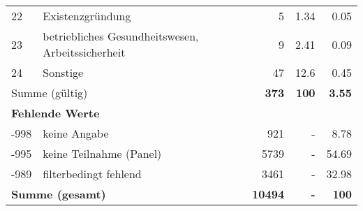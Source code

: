 \begin{longtable}{lXrrr}
        22 & \multicolumn{1}{X}{Existenzgründung} & %
          \num{5} &
          \num[round-mode=places,round-precision=2]{1,34} &
          \num[round-mode=places,round-precision=2]{0,05} \\

        23 & \multicolumn{1}{X}{betriebliches Gesundheitswesen, Arbeitssicherheit} & %
          \num{9} &
          \num[round-mode=places,round-precision=2]{2,41} &
          \num[round-mode=places,round-precision=2]{0,09} \\

        24 & \multicolumn{1}{X}{Sonstige} & %
          \num{47} &
          \num[round-mode=places,round-precision=2]{12,6} &
          \num[round-mode=places,round-precision=2]{0,45} \\

     \midrule
     \multicolumn{2}{l}{Summe (gültig)} &
       \textbf{\num{373}} &
     \textbf{100} &
       \textbf{\num[round-mode=places,round-precision=2]{3,55}} \\
     \multicolumn{5}{l}{\textbf{Fehlende Werte}}\\
       -998 &
       keine Angabe &
         \num{921} &
        - &
         \num[round-mode=places,round-precision=2]{8,78} \\
       -995 &
       keine Teilnahme (Panel) &
         \num{5739} &
        - &
         \num[round-mode=places,round-precision=2]{54,69} \\
       -989 &
       filterbedingt fehlend &
         \num{3461} &
        - &
         \num[round-mode=places,round-precision=2]{32,98} \\
     \midrule
     \multicolumn{2}{l}{\textbf{Summe (gesamt)}} &
          \textbf{\num{10494}} &
        \textbf{-} &
        \textbf{100} \\
     \bottomrule
     \end{longtable}
     
